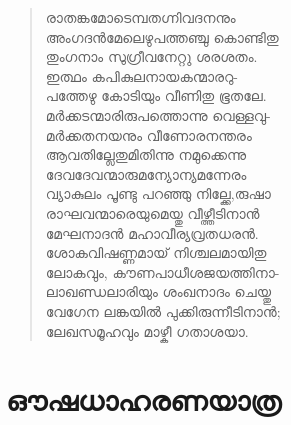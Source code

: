 \begin{verse}
രാതങ്കമോടെമ്പതഗ്നിവദനനും\\
അംഗദന്‍മേലെഴുപത്തഞ്ചു കൊണ്ടിതു\\
തുംഗനാം സുഗ്രീവനേറ്റു ശരശതം.\\
ഇത്ഥം കപികുലനായകന്മാരറു-\\
പത്തേഴു കോടിയും വീണിതു ഭൂതലേ.\\
മര്‍ക്കടന്മാരിരുപത്തൊന്നു വെള്ളവു-\\
മര്‍ക്കതനയനും വീണോരനന്തരം\\
ആവതില്ലേതുമിതിന്നു നമുക്കെന്നു\\
ദേവദേവന്മാരുമന്യോന്യമന്നേരം\\
വ്യാകുലം പൂണ്ടു പറഞ്ഞു നില്ക്കേ,രുഷാ\\
രാഘവന്മാരെയുമെയ്തു വീഴ്ത്തീടിനാന്‍\\
മേഘനാദന്‍ മഹാവീര്യവ്രതധരന്‍.\\
ശോകവിഷണ്ണമായ് നിശ്ചലമായിതു\\
ലോകവും, കൗണപാധീശജയത്തിനാ-\\
ലാഖണ്ഡലാരിയും ശംഖനാദം ചെയ്തു\\
വേഗേന ലങ്കയില്‍ പുക്കിരുന്നീടിനാന്‍;\\
ലേഖസമൂഹവും മാഴ്കീ ഗതാശയാ.
\end{verse}


\section{ഔഷധാഹരണയാത്ര}


